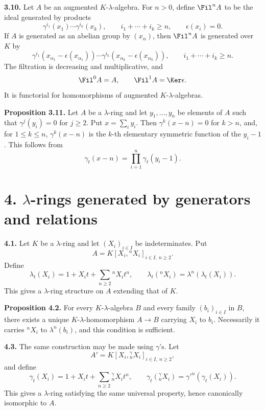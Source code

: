\textbf{3.10.} Let \(A\) be an augmented \(K\)-\(\lambda\)-algebra. For \(n>0\), define \(\Fil^n A\) to be the ideal generated by products
\begin{equation}\tag{3.10.1}
  \gamma^{i_1}(x_1)\cdots\gamma^{i_k}(x_k),
  \qquad i_1+\cdots+i_k\ge n,
  \qquad \epsilon(x_i)=0.
\end{equation}
If \(A\) is generated as an abelian group by \((x_\alpha)\), then \(\Fil^nA\) is generated over \(K\) by
\begin{equation}\tag{3.10.2}
  \gamma^{i_1}(x_{\alpha_1}-\epsilon(x_{\alpha_1}))\cdots
  \gamma^{i_k}(x_{\alpha_k}-\epsilon(x_{\alpha_k})),
  \qquad i_1+\cdots+i_k\ge n.
\end{equation}
The filtration is decreasing and multiplicative, and
\[
  \Fil^0A=A,
  \qquad \Fil^1A=\Ker\epsilon.
\]
It is functorial for homomorphisms of augmented \(K\)-\(\lambda\)-algebras.

\textbf{Proposition 3.11.} Let \(A\) be a \(\lambda\)-ring and let \(y_1,\ldots,y_n\) be elements of \(A\) such that \(\gamma^j(y_i)=0\) for \(j\ge2\). Put \(x=\sum_i y_i\). Then \(\gamma^k(x-n)=0\) for \(k>n\), and, for \(1\le k\le n\), \(\gamma^k(x-n)\) is the \(k\)-th elementary symmetric function of the \(y_i-1\). This follows from
\[
  \gamma_t(x-n)=\prod_{i=1}^{n}\gamma_t(y_i-1).
\]

\section*{4. \(\lambda\)-rings generated by generators and relations}

\textbf{4.1.} Let \(K\) be a \(\lambda\)-ring and let \((X_i)_{i\in I}\) be indeterminates. Put
\[
  A=K[X_i,{}^nX_i]_{i\in I,\ n\ge2}.
\]
Define
\begin{equation}\tag{4.1.1}
  \lambda_t(X_i)=1+X_it+\sum_{n\ge2}{}^nX_i t^n,
  \qquad
  \lambda_t({}^nX_i)=\lambda^n(\lambda_t(X_i)).
\end{equation}
This gives a \(\lambda\)-ring structure on \(A\) extending that of \(K\).

\textbf{Proposition 4.2.} For every \(K\)-\(\lambda\)-algebra \(B\) and every family \((b_i)_{i\in I}\) in \(B\), there exists a unique \(K\)-\(\lambda\)-homomorphism \(A\to B\) carrying \(X_i\) to \(b_i\). Necessarily it carries \({}^nX_i\) to \(\lambda^n(b_i)\), and this condition is sufficient.

\textbf{4.3.} The same construction may be made using \(\gamma\)'s. Let
\[
  A'=K[X_i,{}^\gamma_nX_i]_{i\in I,\ n\ge2},
\]
and define
\begin{equation}\tag{4.3.1}
  \gamma_t(X_i)=1+X_it+\sum_{n\ge2}{}^\gamma_nX_i t^n,
  \qquad
  \gamma_t({}^\gamma_nX_i)=\gamma'^n(\gamma_t(X_i)).
\end{equation}
This gives a \(\lambda\)-ring satisfying the same universal property, hence canonically isomorphic to \(A\).

